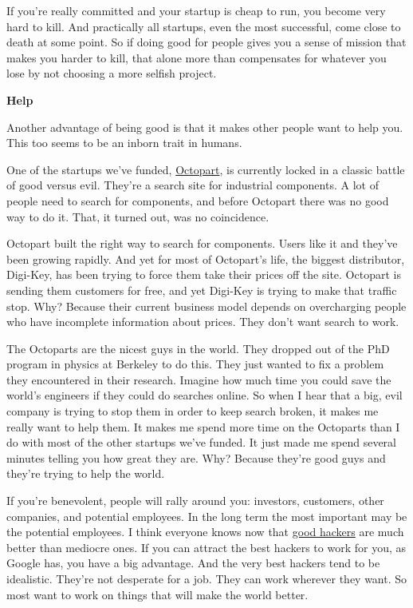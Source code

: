 If you're really committed and your startup is cheap to run, you become
very hard to kill. And practically all startups, even the most
successful, come close to death at some point. So if doing good for
people gives you a sense of mission that makes you harder to kill, that
alone more than compensates for whatever you lose by not choosing a more
selfish project.

\textbf{Help}

Another advantage of being good is that it makes other people want to
help you. This too seems to be an inborn trait in humans.

One of the startups we've funded, \href{http://octopart.com}{Octopart},
is currently locked in a classic battle of good versus evil. They're a
search site for industrial components. A lot of people need to search
for components, and before Octopart there was no good way to do it.
That, it turned out, was no coincidence.

Octopart built the right way to search for components. Users like it and
they've been growing rapidly. And yet for most of Octopart's life, the
biggest distributor, Digi-Key, has been trying to force them take their
prices off the site. Octopart is sending them customers for free, and
yet Digi-Key is trying to make that traffic stop. Why? Because their
current business model depends on overcharging people who have
incomplete information about prices. They don't want search to work.

The Octoparts are the nicest guys in the world. They dropped out of the
PhD program in physics at Berkeley to do this. They just wanted to fix a
problem they encountered in their research. Imagine how much time you
could save the world's engineers if they could do searches online. So
when I hear that a big, evil company is trying to stop them in order to
keep search broken, it makes me really want to help them. It makes me
spend more time on the Octoparts than I do with most of the other
startups we've funded. It just made me spend several minutes telling you
how great they are. Why? Because they're good guys and they're trying to
help the world.

If you're benevolent, people will rally around you: investors,
customers, other companies, and potential employees. In the long term
the most important may be the potential employees. I think everyone
knows now that \href{gh.html}{good hackers} are much better than
mediocre ones. If you can attract the best hackers to work for you, as
Google has, you have a big advantage. And the very best hackers tend to
be idealistic. They're not desperate for a job. They can work wherever
they want. So most want to work on things that will make the world
better.


